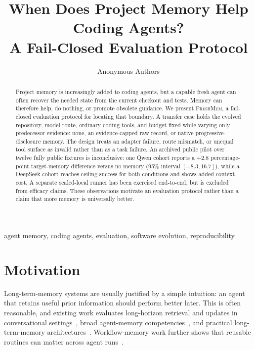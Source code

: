 \documentclass[10pt,conference]{IEEEtran}
\title{When Does Project Memory Help Coding Agents?\\
  A Fail-Closed Evaluation Protocol}
\author{Anonymous Authors}
\newcommand{\bench}{\textsc{FreshMem}}
\begin{document}
\maketitle

\begin{abstract}
Project memory is increasingly added to coding agents, but a capable fresh
agent can often recover the needed state from the current checkout and tests.
Memory can therefore help, do nothing, or promote obsolete guidance. We present
\bench{}, a fail-closed evaluation protocol for locating that boundary. A transfer case
holds the evolved repository, model route, ordinary coding tools, and budget
fixed while varying only predecessor evidence: none, an evidence-capped raw
record, or native progressive-disclosure memory. The design treats an adapter
failure, route mismatch, or unequal tool surface as invalid rather than as a
task failure. An archived public pilot over twelve fully public fixtures is
inconclusive: one Qwen cohort reports a $+2.8$ percentage-point target-memory
difference versus no memory (95\% interval $[-8.3,16.7]$), while a DeepSeek
cohort reaches ceiling success for both conditions and shows added context cost.
A separate sealed-local runner has been exercised end-to-end, but is excluded
from efficacy claims. These observations motivate an evaluation protocol rather
than a claim that more memory is universally better.
\end{abstract}

\begin{IEEEkeywords}
agent memory, coding agents, evaluation, software evolution, reproducibility
\end{IEEEkeywords}

\section{Motivation}

Long-term-memory systems are usually justified by a simple intuition: an agent
that retains useful prior information should perform better later. This is often
reasonable, and existing work evaluates long-horizon retrieval and updates in
conversational settings~\cite{wu2024longmemeval,maharana2024locomo}, broad
agent-memory competencies~\cite{tan2025membench,shen2026mem2actbench}, and
practical long-term-memory architectures~\cite{chhikara2025mem0,kang2025memoryos}. Workflow-memory
work further shows that reusable routines can matter across agent
runs~\cite{wang2024agentworkflowmemory}.
\end{document}
